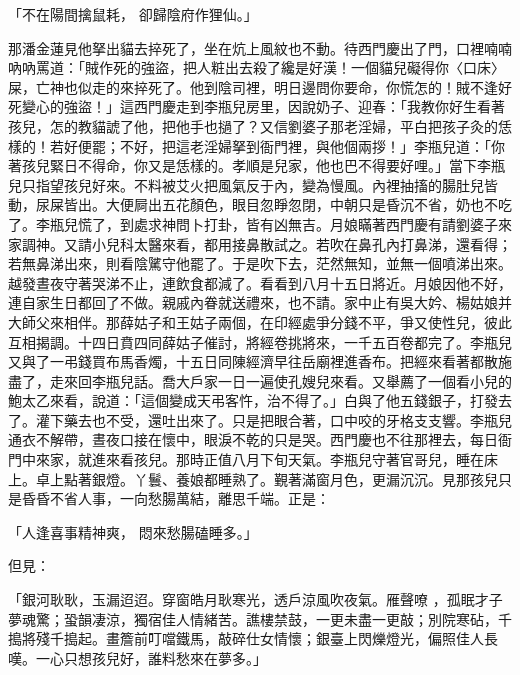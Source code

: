 \begin{showcontents}{}
「不在陽間擒鼠耗，  卻歸陰府作狸仙。」

那潘金蓮見他拏出貓去捽死了，坐在炕上風紋也不動。待西門慶出了門，口裡喃喃吶吶罵道：「賊作死的強盜，把人粧出去殺了纔是好漢！一個貓兒礙得你〈口床〉屎，亡神也似走的來捽死了。他到陰司裡，明日邊問你要命，你慌怎的！賊不逢好死變心的強盜！」這西門慶走到李瓶兒房里，因說奶子、迎春：「我教你好生看著孩兒，怎的教貓諕了他，把他手也撾了？又信劉婆子那老淫婦，平白把孩子灸的恁樣的！若好便罷；不好，把這老淫婦拏到衙門裡，與他個兩拶！」李瓶兒道：「你著孩兒緊日不得命，你又是恁樣的。孝順是兒家，他也巴不得要好哩。」當下李瓶兒只指望孩兒好來。不料被艾火把風氣反于內，變為慢風。內裡抽搐的腸肚兒皆動，尿屎皆出。大便屙出五花顏色，眼目忽睜忽閉，中朝只是昏沉不省，奶也不吃了。李瓶兒慌了，到處求神問卜打卦，皆有凶無吉。月娘瞞著西門慶有請劉婆子來家調神。又請小兒科太醫來看，都用接鼻散試之。若吹在鼻孔內打鼻涕，還看得；若無鼻涕出來，則看陰騭守他罷了。于是吹下去，茫然無知，並無一個噴涕出來。越發晝夜守著哭涕不止，連飲食都減了。看看到八月十五日將近。月娘因他不好，連自家生日都回了不做。親戚內眷就送禮來，也不請。家中止有吳大妗、楊姑娘并大師父來相伴。那薛姑子和王姑子兩個，在印經處爭分錢不平，爭又使性兒，彼此互相揭調。十四日賁四同薛姑子催討，將經卷挑將來，一千五百卷都完了。李瓶兒又與了一弔錢買布馬香燭，十五日同陳經濟早往岳廟裡進香布。把經來看著都散施盡了，走來回李瓶兒話。喬大戶家一日一遍使孔嫂兒來看。又舉薦了一個看小兒的鮑太乙來看，說道：「這個變成天弔客忤，治不得了。」白與了他五錢銀子，打發去了。灌下藥去也不受，還吐出來了。只是把眼合著，口中咬的牙格支支響。李瓶兒通衣不解帶，晝夜口接在懷中，眼淚不乾的只是哭。西門慶也不往那裡去，每日衙門中來家，就進來看孩兒。那時正值八月下旬天氣。李瓶兒守著官哥兒，睡在床上。卓上點著銀燈。丫鬟、養娘都睡熟了。覲著滿窗月色，更漏沉沉。見那孩兒只是昏昏不省人事，一向愁腸萬結，離思千端。正是：

「人逢喜事精神爽，  悶來愁腸磕睡多。」

但見：

「銀河耿耿，玉漏迢迢。穿窗皓月耿寒光，透戶涼風吹夜氣。雁聲嘹 ，孤眠才子夢魂驚；蛩韻凄涼，獨宿佳人情緒苦。譙樓禁鼓，一更未盡一更敲；別院寒砧，千搗將殘千搗起。畫簷前叮噹鐵馬，敲碎仕女情懷；銀臺上閃爍燈光，偏照佳人長嘆。一心只想孩兒好，誰料愁來在夢多。」


\end{showcontents}
